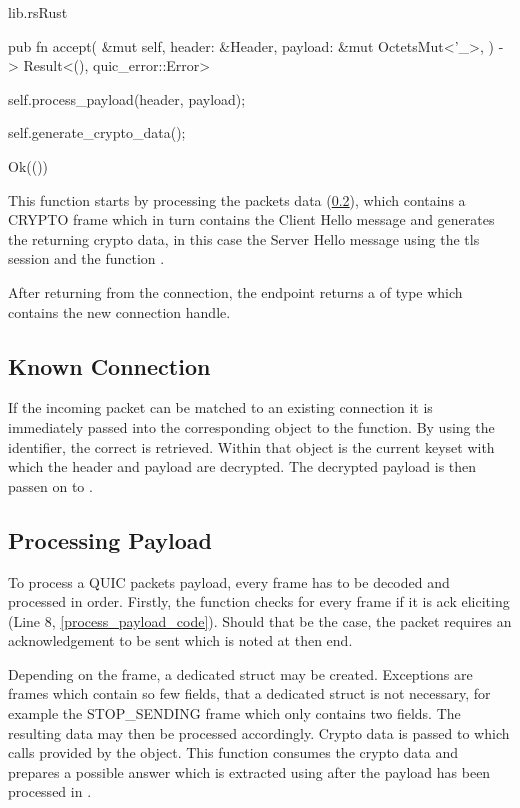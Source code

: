 \begin{codeblock}{lib.rs}{Rust}
    \begin{rustcode}
        pub fn accept(
            &mut self,
            header: &Header,
            payload: &mut OctetsMut<'_>,
        ) -> Result<(), quic_error::Error> {
            self.process_payload(header, payload);

            self.generate_crypto_data();

            Ok(())
        }
    \end{rustcode}
\end{codeblock}

This function starts by processing the packets data (\ref{process_payload}), which contains a CRYPTO frame which in turn
contains the Client Hello message and generates the returning crypto data, in this case the Server Hello message using
the tls session and the function .

After returning from the connection, the endpoint returns a  of type  which
contains the new connection handle.

\subsection{Known Connection} \label{known_conn}

If the incoming packet can be matched to an existing connection it is immediately passed into the corresponding object to
the  function. By using the  identifier, the correct 
is retrieved. Within that object is the current keyset with which the header and payload are decrypted. The decrypted payload
is then passen on to .

\subsection{Processing Payload} \label{process_payload}

To process a QUIC packets payload, every frame has to be decoded and processed in order. Firstly, the function checks for
every frame if it is ack eliciting (Line 8, \ref{process_payload_code}). Should that be the case, the packet requires an acknowledgement
to be sent which is noted at then end. 

Depending on the frame, a dedicated struct may be created. Exceptions are frames which contain so few fields, that a dedicated struct
is not necessary, for example the STOP\_SENDING frame which only contains two fields. The resulting data may then be processed
accordingly. Crypto data is passed to  which calls  provided by the
 object. This function consumes the crypto data and prepares a possible answer which is extracted
using  after the payload has been processed in .

